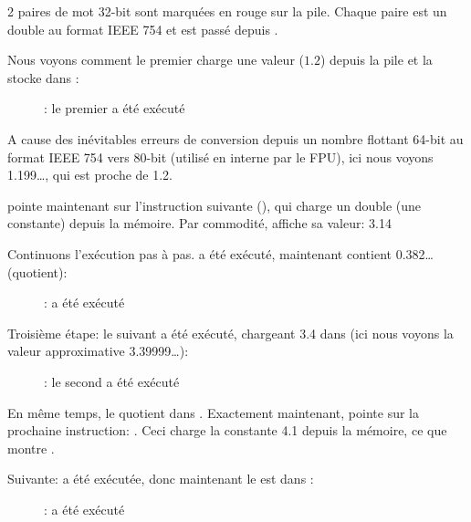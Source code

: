 ﻿\clearpage
{}
\myindex{\olly}

2 paires de mot 32-bit sont marquées en rouge sur la pile.
Chaque paire est un double au format IEEE 754 et est passé depuis \main.

Nous voyons comment le premier \FLD charge une valeur ($1.2$) depuis la pile et la
stocke dans :

\begin{figure}[H]
\centering
{}
\caption{\olly: le premier \FLD a été exécuté}
\label{fig:FPU_simple_olly_1}
\end{figure}

A cause des inévitables erreurs de conversion depuis un nombre flottant 64-bit au
format IEEE 754 vers 80-bit (utilisé en interne par le FPU), ici nous voyons 1.199\ldots,
qui est proche de 1.2.

\EIP pointe maintenant sur l'instruction suivante (\FDIV), qui charge un double
(une constante) depuis la mémoire.
Par commodité, \olly affiche sa valeur: 3.14

\clearpage
Continuons l'exécution pas à pas.
\FDIV a été exécuté, maintenant  contient 0.382\ldots
(\gls{quotient}):

\begin{figure}[H]
\centering
{}
\caption{\olly: \FDIV a été exécuté}
\label{fig:FPU_simple_olly_2}
\end{figure}

\clearpage
Troisième étape: le \FLD suivant a été exécuté, chargeant 3.4 dans  (ici nous
voyons la valeur approximative 3.39999\ldots):

\begin{figure}[H]
\centering
{}
\caption{\olly: le second \FLD a été exécuté}
\label{fig:FPU_simple_olly_3}
\end{figure}

En même temps, le \gls{quotient}  dans .
Exactement maintenant, \EIP pointe sur la prochaine instruction: \FMUL.
Ceci charge la constante 4.1 depuis la mémoire, ce que montre \olly.

\clearpage
Suivante: \FMUL a été exécutée, donc maintenant le  est dans :

\begin{figure}[H]
\centering
{}
\caption{\olly: \FMUL a été exécuté}
\label{fig:FPU_simple_olly_4}
\end{figure}

